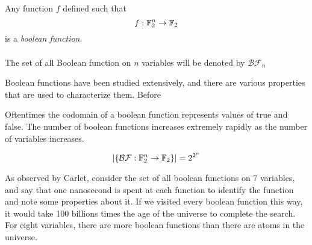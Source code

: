 \begin{definition}
\label{def:boolean-function}
  Any function $f$ defined such that 
  \begin{equation}
    f:\mathbb{F}_2^n\rightarrow\mathbb{F}_2
  \end{equation}
  is a {\em boolean function}.\\
	\\
	The set of all Boolean function on $n$ variables will be denoted by $\mathcal{BF}_n$
\end{definition}

\par Boolean functions have been studied extensively, and there are various properties that
are used to characterize them. Before

\par Oftentimes the codomain of a boolean function represents values of true
and false. The number of boolean functions increases
extremely rapidly as the number of variables increases.

\begin{equation}
  \lvert\{\mathcal{BF}:\mathbb{F}_2^n\rightarrow\mathbb{F}_2\}\rvert = 2^{2^n}
\end{equation}

\par As observed by Carlet, consider the set of all boolean functions on 7 variables,
and say that one nanosecond is spent at each function to identify the function and
note some properties about it. If we visited every boolean function this way, it
would take 100 billions times the age of the universe to complete the search.
For eight variables, there are more boolean functions than there are atoms in the
universe.

